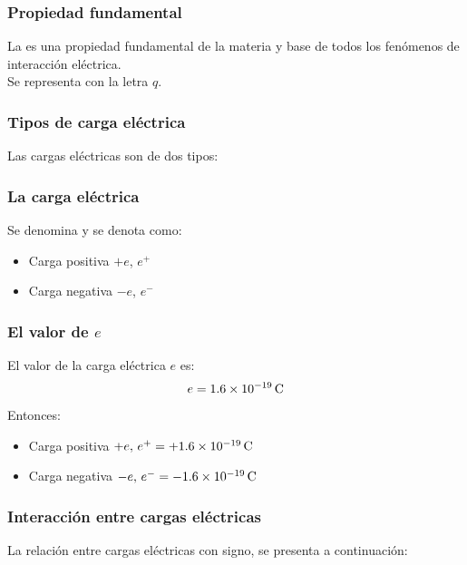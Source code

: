 \documentclass[14pt]{beamer}
\begin{document}
\begin{frame}
\frametitle{Propiedad fundamental}
La  es una propiedad fundamental de la materia y base de todos los fenómenos de interacción eléctrica.
\\
\bigskip
\pause
Se representa con la letra $q$.
\end{frame}
\begin{frame}
\frametitle{Tipos de carga eléctrica}
Las cargas eléctricas son de dos tipos:
\pause
\begin{figure}
    \centering
\end{figure}
\end{frame}
\begin{frame}
\frametitle{La carga eléctrica}
Se denomina  y se denota como:
\pause
\begin{itemize}
\item Carga positiva $+e$, $e^{+}$
\item Carga negativa $-e$, $e^{-}$
\end{itemize}
\end{frame}
\begin{frame}
\frametitle{El valor de $e$}
El valor de la carga eléctrica $e$ es:
\pause
\begin{align*}
e = \SI{1.6d-19}{\coulomb}
\end{align*}
\pause
Entonces:
\begin{itemize}
\item Carga positiva $+e, \, e^{+} = + \SI{1.6d-19}{\coulomb}$
\item Carga negativa $-e, \, e^{-} = -\SI{1.6d-19}{\coulomb}$
\end{itemize}    
\end{frame}
\begin{frame}
\frametitle{Interacción entre cargas eléctricas}
La relación entre cargas eléctricas con signo, se presenta a continuación:
\end{frame}
\end{document}
